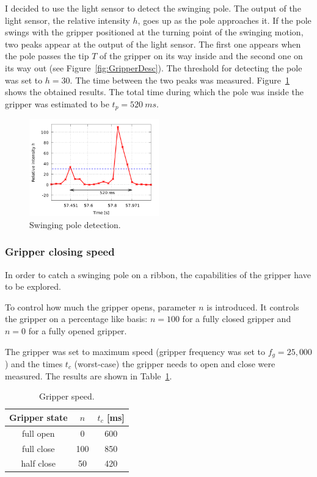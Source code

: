             I decided to use the light sensor to detect the swinging pole. The output of the light sensor, the relative intensity $h$, goes up as the pole approaches it. If the pole swings with the gripper positioned at the turning point of the swinging motion, two peaks appear at the output of the light sensor. The first one appears when the pole passes the tip $T$ of the gripper on its way inside and the second one on its way out (see Figure~\ref{fig:GripperDesc}). The threshold for detecting the pole was set to $h = 30$. The time between the two peaks was measured. Figure~\ref{fig:SwingMeasurement} shows the obtained results. The total time during which the pole was inside the gripper was estimated to be $t_p = \SI{520}{ms}$.


            \begin{figure}[h]
            \includegraphics[width=0.5\textwidth]{SwingMeasurement.png}
            \centering
            \caption{Swinging pole detection.}
            \label{fig:SwingMeasurement}
            \end{figure}

        \subsubsection{Gripper closing speed}
            In order to catch a swinging pole on a ribbon, the capabilities of the gripper have to be explored.

            To control how much the gripper opens, parameter $n$ is introduced. It controls the gripper on a percentage like basis: $n=100$ for a fully closed gripper and $n=0$ for a fully opened gripper.

            The gripper was set to maximum speed (gripper frequency was set to $f_g = 25,000$) and the times $t_c$ (worst-case) the gripper needs to open and close were measured. The results are shown in Table~\ref{table:GripperClosingSpeeds}.

            \begin{table}\centering
            \begin{tabular}{@{}ccc@{}}\toprule
            Gripper state & $n$ & $ t_{c}$ [ms] \\ \midrule
            full open & 0 & 600 \\
            full close & 100 & 850 \\
            half close & 50 & 420 \\
            \bottomrule
            \end{tabular}
            \caption{Gripper speed.}
            \label{table:GripperClosingSpeeds}
            \end{table}


